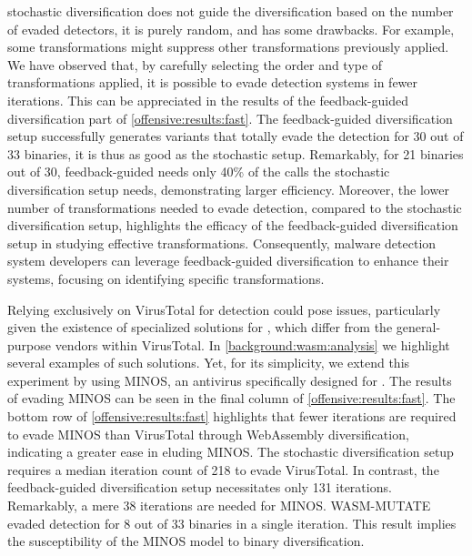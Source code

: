\begin{strategy}
    \label{guided_div_vt}
    stochastic diversification does not guide the diversification based on the number of evaded detectors, it is purely random, and has some drawbacks.
    For example, some transformations might suppress other transformations previously applied.
    We have observed that, by carefully selecting the order and type of transformations applied, it is possible to evade detection systems in fewer iterations.
    This can be appreciated in the results of the feedback-guided diversification part of \autoref{offensive:results:fast}.
    The feedback-guided diversification setup successfully generates variants that totally evade the detection for 30 out of 33 binaries, it is thus as good as the stochastic setup.
    Remarkably, for 21 binaries out of 30, feedback-guided needs only 40\% of the calls the stochastic diversification setup needs, demonstrating larger efficiency. 
    Moreover, the lower number of transformations needed to evade detection, compared to the stochastic diversification setup, highlights the efficacy of the feedback-guided diversification setup in studying effective transformations.
    Consequently, malware detection system developers can leverage feedback-guided diversification to enhance their systems, focusing on identifying specific transformations.



\end{strategy}
  
\begin{strategy}
    \label{stochastic_div_minos}
    Relying exclusively on VirusTotal for detection could pose issues, particularly given the existence of specialized solutions for \Wasm, which differ from the general-purpose vendors within VirusTotal. 
    In \autoref{background:wasm:analysis} we highlight several examples of such solutions.
    Yet, for its simplicity, we extend this experiment by using MINOS\cite{MINOS}, an antivirus specifically designed for \Wasm. 
    The results of evading MINOS can be seen in the final column of \autoref{offensive:results:fast}.
    The bottom row of \autoref{offensive:results:fast} highlights that fewer iterations are required to evade MINOS than VirusTotal through WebAssembly diversification, indicating a greater ease in eluding MINOS.
    The stochastic diversification setup requires a median iteration count of 218 to evade VirusTotal. 
    In contrast, the feedback-guided diversification setup necessitates only 131 iterations. 
    Remarkably, a mere 38 iterations are needed for MINOS. 
    WASM-MUTATE evaded detection for 8 out of 33 binaries in a single iteration. 
    This result implies the susceptibility of the MINOS model to binary diversification.
\end{strategy}
    
